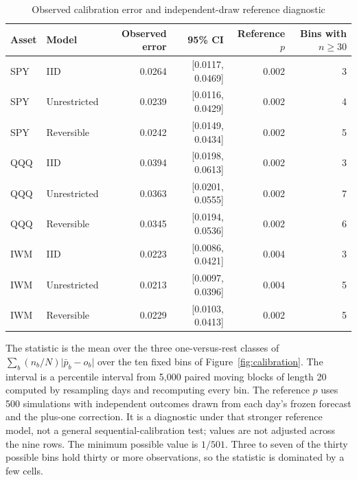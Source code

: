 \begin{table}[!htbp]\centering\small\setlength{\tabcolsep}{6pt}
\caption{Observed calibration error and independent-draw reference diagnostic}\label{tab:calibration}
\begin{tabular}{llrrrr}\toprule
Asset & Model & Observed error & 95\% CI & Reference $p$ & Bins with $n\ge30$\\\midrule
SPY & IID & 0.0264 & [0.0117, 0.0469] & 0.002 & 3\\
SPY & Unrestricted & 0.0239 & [0.0116, 0.0429] & 0.002 & 4\\
SPY & Reversible & 0.0242 & [0.0149, 0.0434] & 0.002 & 5\\
\midrule
QQQ & IID & 0.0394 & [0.0198, 0.0613] & 0.002 & 3\\
QQQ & Unrestricted & 0.0363 & [0.0201, 0.0555] & 0.002 & 7\\
QQQ & Reversible & 0.0345 & [0.0194, 0.0536] & 0.002 & 6\\
\midrule
IWM & IID & 0.0223 & [0.0086, 0.0421] & 0.004 & 3\\
IWM & Unrestricted & 0.0213 & [0.0097, 0.0396] & 0.004 & 5\\
IWM & Reversible & 0.0229 & [0.0103, 0.0413] & 0.002 & 5\\
\bottomrule\end{tabular}
\par\smallskip\parbox{0.98\linewidth}{\footnotesize The statistic is the mean over the three one-versus-rest classes of $\sum_b (n_b/N)\lvert\bar p_b-\hat o_b\rvert$ over the ten fixed bins of Figure~\ref{fig:calibration}. The interval is a percentile interval from 5,000 paired moving blocks of length 20 computed by resampling days and recomputing every bin. The reference $p$ uses 500 simulations with independent outcomes drawn from each day's frozen forecast and the plus-one correction. It is a diagnostic under that stronger reference model, not a general sequential-calibration test; values are not adjusted across the nine rows. The minimum possible value is $1/501$. Three to seven of the thirty possible bins hold thirty or more observations, so the statistic is dominated by a few cells.}
\end{table}
